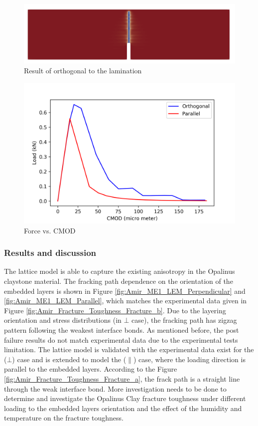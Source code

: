 \begin{figure}[!ht]
\centering
\includegraphics[width=1\textwidth]{figures/ME1_ext_2D_orth_result.png}
\caption{Result of orthogonal to the lamination}
\label{fig:ME1_ext_vpf_orth_result}
\end{figure}

\begin{figure}[!ht]
\centering
\includegraphics[width=1\textwidth]{figures/VPF_ME1_ex_NF_CMOD.png}
\caption{Force vs. CMOD}
\label{fig:ME1_ext_vpf_FvsCMOD}
\end{figure}

\subsubsection{Results and discussion}

The lattice model is able to capture the existing anisotropy in the Opalinus claystone material. The fracking path dependence on the orientation of the embedded layers is shown in Figure \ref{fig:Amir_ME1_LEM_Perpendicular} and \ref{fig:Amir_ME1_LEM_Parallel}, which matches the experimental data given in Figure \ref{fig:Amir_Fracture_Toughness_Fracture_b}. Due to the layering orientation and stress distributions (in $\bot$ case), the fracking path has zigzag pattern following the weakest interface bonds. As mentioned before, the post failure results do not match experimental data due to the experimental tests limitation. The lattice model is validated with the experimental data exist for the ($\bot$) case and is extended to model the ($\parallel$) case, where the loading direction is parallel to the embedded layers. According to the Figure \ref{fig:Amir_Fracture_Toughness_Fracture_a}, the frack path is a straight line through the weak interface bond. More investigation needs to be done to determine and investigate the Opalinus Clay fracture toughness under different loading to the embedded layers orientation and the effect of the humidity and temperature on the fracture toughness. 

